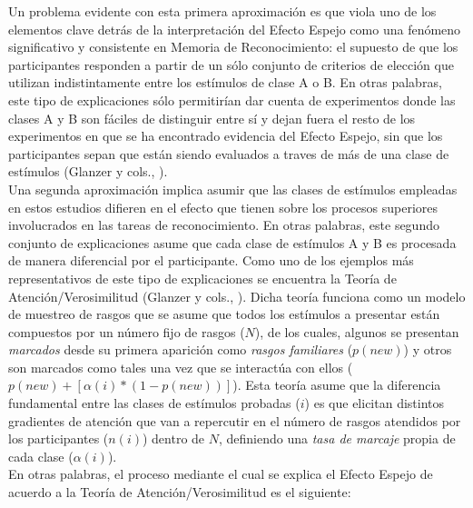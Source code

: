Un problema evidente con esta primera aproximación es que viola uno de los elementos clave detrás de la interpretación del Efecto Espejo como una fenómeno significativo y consistente en Memoria de Reconocimiento: el supuesto de que los participantes responden a partir de un sólo conjunto de criterios de elección que utilizan indistintamente entre los estímulos de clase A o B. En otras palabras, este tipo de explicaciones sólo permitirían dar cuenta de experimentos donde las clases A y B son fáciles de distinguir entre sí y dejan fuera el resto de los experimentos en que se ha encontrado evidencia del Efecto Espejo, sin que los participantes sepan que están siendo evaluados a traves de más de una clase de estímulos (Glanzer y cols., \citeyear{Glanzer1998}).\\

Una segunda aproximación implica asumir que las clases de estímulos empleadas en estos estudios difieren en el efecto que tienen sobre los procesos superiores involucrados en las tareas de reconocimiento. En otras palabras, este segundo conjunto de explicaciones asume que cada clase de estímulos A y B es procesada de manera diferencial por el participante. Como uno de los ejemplos más representativos de este tipo de explicaciones se encuentra la Teoría de Atención/Verosimilitud (Glanzer y cols., \citeyear{Glanzer1993}). Dicha teoría funciona como un modelo de muestreo de rasgos que se asume que todos los estímulos a presentar están compuestos por un número fijo de rasgos ($N$), de los cuales, algunos se presentan \textit{marcados} desde su primera aparición como \textit{rasgos familiares} ($p(new)$) y otros son marcados como tales una vez que se interactúa con ellos ($p(new) + [\alpha(i)* (1-p(new))]$). Esta teoría asume que la diferencia fundamental entre  las clases de estímulos probadas ($i$) es que elicitan distintos gradientes de atención que van a repercutir en el número de rasgos atendidos por los participantes ($n(i)$) dentro de $N$, definiendo una \textit{tasa de marcaje} propia de cada clase ($\alpha(i)$).\\

En otras palabras, el proceso mediante el cual se explica el Efecto Espejo de acuerdo a la Teoría de Atención/Verosimilitud es el siguiente:\\

